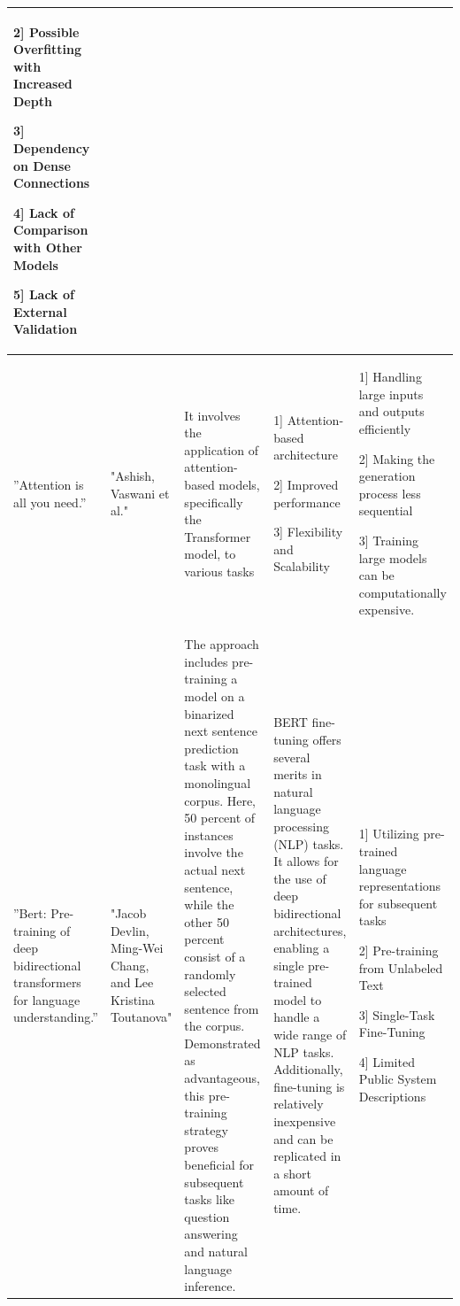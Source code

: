 \documentclass[fleqn,10pt]{thescipub} %
\begin{document}
\begin{table}
\begin{center}
\begin{tabular}{ |p{2cm}|p{2cm}|p{4cm}|p{4cm}|p{3cm}| }
2] Possible Overfitting with Increased Depth

3] Dependency on Dense Connections

4] Lack of Comparison with Other Models

5] Lack of External Validation \\
\hline
[21] ”Attention is all you need.” & "Ashish, Vaswani et al." & It involves the application of attention-based models, specifically the Transformer model, to various tasks & 1] Attention-based architecture

2]  Improved performance

3] Flexibility and Scalability 
 & 1] Handling large inputs and outputs efficiently

2] Making the generation process less sequential

3] Training large models can be computationally expensive. \\
\hline
”Bert: Pre-training of deep bidirectional transformers for language understanding.”  & "Jacob Devlin, Ming-Wei Chang, and Lee Kristina Toutanova" & The approach includes pre-training a model on a binarized next sentence prediction task with a monolingual corpus. Here, 50 percent of instances involve the actual next sentence, while the other 50 percent consist of a randomly selected sentence from the corpus. Demonstrated as advantageous, this pre-training strategy proves beneficial for subsequent tasks like question answering and natural language inference.& BERT fine-tuning offers several merits in natural language processing (NLP) tasks. It allows for the use of deep bidirectional architectures, enabling a single pre-trained model to handle a wide range of NLP tasks. Additionally, fine-tuning is relatively inexpensive and can be replicated in a short amount of time. & 1] Utilizing pre-trained language representations for subsequent tasks

2] Pre-training from Unlabeled Text

3] Single-Task Fine-Tuning

4]  Limited Public System Descriptions
 \\
\hline

\end{tabular}
\end{center}
\end{table}
\end{document}
